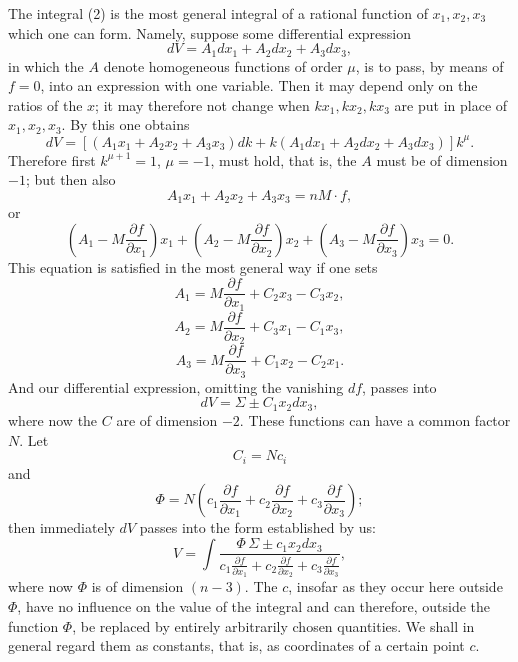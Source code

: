 \documentclass[10pt]{article}
\begin{document}
The integral (2) is the most general integral of a rational function of $x_1,x_2,x_3$ which one can form. Namely, suppose some differential expression
\[
dV=A_1dx_1+A_2dx_2+A_3dx_3,
\]
in which the $A$ denote homogeneous functions of order $\mu$, is to pass, by means of $f=0$, into an expression with one variable. Then it may depend only on the ratios of the $x$; it may therefore not change when $kx_1,kx_2,kx_3$ are put in place of $x_1,x_2,x_3$. By this one obtains
\[
dV=[(A_1x_1+A_2x_2+A_3x_3)dk+k(A_1dx_1+A_2dx_2+A_3dx_3)]k^\mu.
\]
Therefore first $k^{\mu+1}=1$, $\mu=-1$, must hold, that is, the $A$ must be of dimension $-1$; but then also
\[
A_1x_1+A_2x_2+A_3x_3=nM\cdot f,
\]
or
\[
\left(A_1-M\frac{\partial f}{\partial x_1}\right)x_1+
\left(A_2-M\frac{\partial f}{\partial x_2}\right)x_2+
\left(A_3-M\frac{\partial f}{\partial x_3}\right)x_3=0.
\]
This equation is satisfied in the most general way if one sets
\[
A_1=M\frac{\partial f}{\partial x_1}+C_2x_3-C_3x_2,
\]
\[
A_2=M\frac{\partial f}{\partial x_2}+C_3x_1-C_1x_3,
\]
\[
A_3=M\frac{\partial f}{\partial x_3}+C_1x_2-C_2x_1.
\]
And our differential expression, omitting the vanishing $df$, passes into
\[
dV=\Sigma\pm C_1x_2dx_3,
\]
where now the $C$ are of dimension $-2$. These functions can have a common factor $N$. Let
\[
C_i=Nc_i
\]
and
\[
\Phi=N\left(c_1\frac{\partial f}{\partial x_1}+c_2\frac{\partial f}{\partial x_2}+c_3\frac{\partial f}{\partial x_3}\right);
\]
then immediately $dV$ passes into the form established by us:
\[
V=\int\frac{\Phi\,\Sigma\pm c_1x_2dx_3}{c_1\frac{\partial f}{\partial x_1}+c_2\frac{\partial f}{\partial x_2}+c_3\frac{\partial f}{\partial x_3}},
\]
where now $\Phi$ is of dimension $(n-3)$. The $c$, insofar as they occur here outside $\Phi$, have no influence on the value of the integral and can therefore, outside the function $\Phi$, be replaced by entirely arbitrarily chosen quantities. We shall in general regard them as constants, that is, as coordinates of a certain point $c$.
\end{document}

